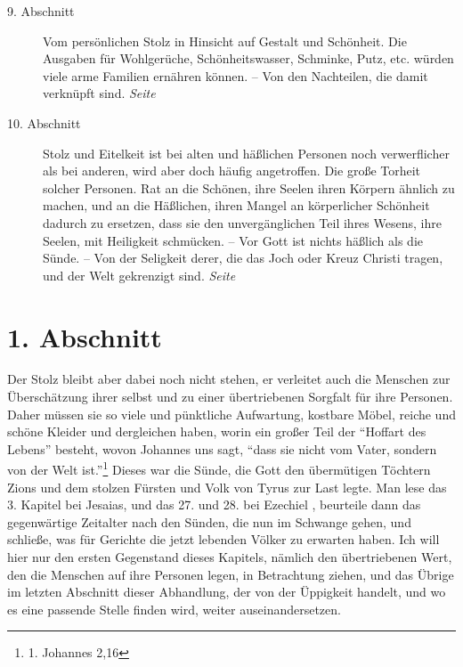 \begin{description}
\item[9. Abschnitt] Vom persönlichen Stolz in Hinsicht auf Gestalt und
Schönheit. Die Ausgaben für Wohlgerüche, Schönheitswasser, Schminke, Putz, etc.
würden viele arme Familien ernähren können. -- Von den Nachteilen, die damit
verknüpft sind.
\dotfill \textit{Seite~\pageref{kap11_ab9}}\\
\item[10. Abschnitt] Stolz und Eitelkeit ist bei alten und häßlichen Personen
noch verwerflicher als bei anderen, wird aber doch häufig angetroffen. Die große
Torheit solcher Personen. Rat an die Schönen, ihre Seelen ihren Körpern
ähnlich zu machen, und an die Häßlichen, ihren Mangel an körperlicher Schönheit
dadurch zu ersetzen, dass sie den unvergänglichen Teil ihres Wesens, ihre
Seelen, mit Heiligkeit schmücken. -- Vor Gott ist nichts häßlich als die Sünde.
-- Von der Seligkeit derer, die das Joch oder Kreuz Christi tragen, und der Welt
gekrenzigt sind.
\dotfill \textit{Seite~\pageref{kap11_ab10}}\\

\end{description}

\newpage

\section{1. Abschnitt} \label{kap11_ab1}

Der Stolz bleibt aber dabei noch nicht stehen, er verleitet auch die Menschen
zur Überschätzung ihrer selbst und zu einer übertriebenen Sorgfalt für ihre
Personen. Daher müssen sie so viele und pünktliche Aufwartung, kostbare
Möbel,
reiche und schöne Kleider und dergleichen haben, worin ein
großer Teil
der "`Hoffart
des Lebens"' besteht, wovon Johannes uns sagt,
"`dass sie nicht vom Vater,
sondern von der Welt ist."'\footnote{1. Johannes 2,16}
Dieses war die Sünde, die Gott
den übermütigen Töchtern Zions und dem stolzen
Fürsten und Volk von Tyrus zur
Last legte. Man lese das 3. Kapitel bei Jesaias,
und das 27. und 28. bei
Ezechiel ,
beurteile dann das gegenwärtige Zeitalter nach den Sünden, die nun im
Schwange gehen, und schließe, was für Gerichte die jetzt lebenden Völker zu
erwarten haben. Ich will hier nur den ersten Gegenstand dieses Kapitels, nämlich
den übertriebenen Wert, den die Menschen auf ihre Personen legen, in
Betrachtung ziehen, und das Übrige im letzten Abschnitt dieser Abhandlung, der
von der Üppigkeit handelt, und wo es eine passende Stelle finden wird,
weiter auseinandersetzen.

